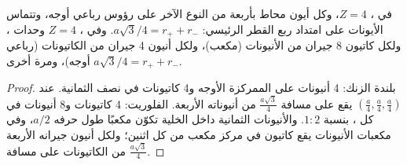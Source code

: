 \begin{proposition}\label{prop:b1:crystals-ionic-covalent:zns-caf2}
في ، $Z = 4$، وكل أيون محاط بأربعة من
النوع الآخر على رؤوس رباعي أوجه، وتتماس الأيونات على امتداد
ربع القطر الرئيسي: $a\sqrt3/4 = r_+ + r_-$. وفي ، $Z = 4$ وحدات ، ولكل كاتيون 8 جيران من الأنيونات (مكعب)،
ولكل أنيون 4 جيران من الكاتيونات (رباعي أوجه)، ومرة أخرى $a\sqrt3/4 =
r_+ + r_-$.
\end{proposition}

\begin{proof}
بلندة الزنك: 4 أنيونات على  الممركزة الأوجه و4 كاتيونات في نصف  الثمانية.  عند $(\frac a4,\frac a4,\frac a4)$
يقع على مسافة $\frac{a\sqrt3}{4}$ من أنيوناته الأربعة. الفلوريت: 4 كاتيونات
و8 أنيونات في كل ، بنسبة $1:2$. والأنيونات الثمانية داخل
الخلية تكوّن مكعبًا طول حرفه $a/2$، وفي مكعبات الأنيونات يقع
كاتيون في مركز مكعب من كل اثنين؛ ولكل أنيون جيرانه الأربعة من الكاتيونات
على مسافة $\frac{a\sqrt3}{4}$.
\end{proof}

